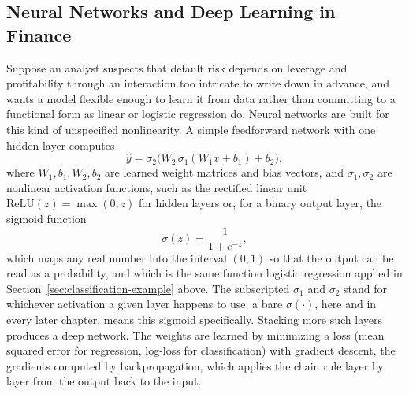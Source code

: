 \documentclass[../ai_in_finance]{subfiles}
\begin{document}
\subsection{Neural Networks and Deep Learning in Finance}

Suppose an analyst suspects that default risk depends on leverage and profitability through an interaction too intricate to write down in advance, and wants a model flexible enough to learn it from data rather than committing to a functional form as linear or logistic regression do. Neural networks are built for this kind of unspecified nonlinearity. A simple feedforward network with one hidden layer computes
\begin{equation*}
\hat y = \sigma_2\big(W_2\, \sigma_1(W_1 x + b_1) + b_2\big),
\end{equation*}
where $W_1, b_1, W_2, b_2$ are learned weight matrices and bias vectors, and $\sigma_1, \sigma_2$ are nonlinear activation functions, such as the rectified linear unit $\text{ReLU}(z) = \max(0,z)$ for hidden layers or, for a binary output layer, the sigmoid function
\begin{equation*}
\sigma(z) = \frac{1}{1+e^{-z}},
\end{equation*}
which maps any real number into the interval $(0,1)$ so that the output can be read as a probability, and which is the same function logistic regression applied in Section~\ref{sec:classification-example} above. The subscripted $\sigma_1$ and $\sigma_2$ stand for whichever activation a given layer happens to use; a bare $\sigma(\cdot)$, here and in every later chapter, means this sigmoid specifically. Stacking more such layers produces a deep network. The weights are learned by minimizing a loss (mean squared error for regression, log-loss for classification) with gradient descent, the gradients computed by backpropagation, which applies the chain rule layer by layer from the output back to the input.
\end{document}
